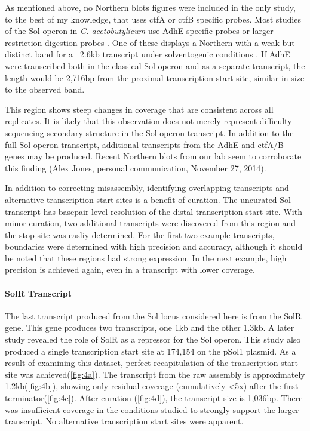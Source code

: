 As mentioned above, no Northern blots figures were included in the only study, to the best of my knowledge, that uses ctfA or ctfB specific probes\cite{65}. Most studies of the Sol operon in \textit{C. acetobutylicum} use AdhE-specific probes or larger restriction digestion probes \cite{63,68,71}. One of these displays a Northern with a weak but distinct band for a ~2.6kb transcript under solventogenic conditions \cite{69}. If AdhE were transcribed both in the classical Sol operon and as a separate transcript, the length would be 2,716bp from the proximal transcription start site, similar in size to the observed band\cite{69}. 

This region shows steep changes in coverage that are consistent across all replicates. It is likely that this observation does not merely represent difficulty sequencing secondary structure in the Sol operon transcript. In addition to the full Sol operon transcript, additional transcripts from the AdhE and ctfA/B genes may be produced. Recent Northern blots from our lab seem to corroborate this finding (Alex Jones, personal communication, November 27, 2014).

In addition to correcting misassembly, identifying overlapping transcripts and alternative transcription start sites is a benefit of curation. The uncurated Sol transcript has basepair-level resolution of the distal transcription start site. With minor curation, two additional transcripts were discovered from this region and the stop site was easliy determined. For the first two example transcripts, boundaries were determined with high precision and accuracy, although it should be noted that these regions had strong expression. In the next example, high precision is achieved again, even in a transcript with lower coverage.


\paragraph{SolR Transcript}
The last transcript produced from the Sol locus considered here is from the SolR gene. This gene produces two transcripts, one 1kb and the other 1.3kb\cite{63}. A later study revealed the role of SolR as a repressor for the Sol operon\cite{69}. This study also produced a single transcription start site at 174,154 on the pSol1 plasmid. As a result of examining this dataset, perfect recapitulation of the transcription start site was achieved(\ref{fig:4a}). The transcript from the raw assembly is approximately 1.2kb(\ref{fig:4b}), showing only residual coverage (cumulatively \textless 5x) after the first terminator(\ref{fig:4c}). After curation (\ref{fig:4d}), the transcript size is 1,036bp. There was insufficient coverage in the conditions studied to strongly support the larger transcript. No alternative transcription start sites were apparent.

